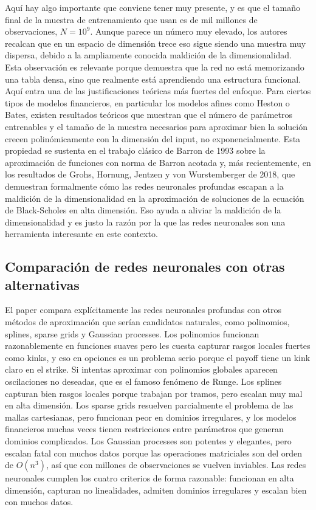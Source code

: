 \documentclass[11pt,a4paper]{article}
\begin{document}
Aquí hay algo importante que conviene tener muy presente, y es que el tamaño final de la muestra de entrenamiento que usan es de mil millones de observaciones, $N = 10^9$. Aunque parece un número muy elevado, los autores recalcan que en un espacio de dimensión trece eso sigue siendo una muestra muy dispersa, debido a la ampliamente conocida maldición de la dimensionalidad. Esta observación es relevante porque demuestra que la red no está memorizando una tabla densa, sino que realmente está aprendiendo una estructura funcional. Aquí entra una de las justificaciones teóricas más fuertes del enfoque. Para ciertos tipos de modelos financieros, en particular los modelos afines como Heston o Bates, existen resultados teóricos que muestran que el número de parámetros entrenables y el tamaño de la muestra necesarios para aproximar bien la solución crecen polinómicamente con la dimensión del input, no exponencialmente. Esta propiedad se sustenta en el trabajo clásico de Barron de 1993 sobre la aproximación de funciones con norma de Barron acotada y, más recientemente, en los resultados de Grohs, Hornung, Jentzen y von Wurstemberger de 2018, que demuestran formalmente cómo las redes neuronales profundas escapan a la maldición de la dimensionalidad en la aproximación de soluciones de la ecuación de Black-Scholes en alta dimensión. Eso ayuda a aliviar la maldición de la dimensionalidad y es justo la razón por la que las redes neuronales son una herramienta interesante en este contexto.

\subsection{Comparación de redes neuronales con otras alternativas}

El paper compara explícitamente las redes neuronales profundas con otros métodos de aproximación que serían candidatos naturales, como polinomios, splines, sparse grids y Gaussian processes. Los polinomios funcionan razonablemente en funciones suaves pero les cuesta capturar rasgos locales fuertes como kinks, y eso en opciones es un problema serio porque el payoff tiene un kink claro en el strike. Si intentas aproximar con polinomios globales aparecen oscilaciones no deseadas, que es el famoso fenómeno de Runge. Los splines capturan bien rasgos locales porque trabajan por tramos, pero escalan muy mal en alta dimensión. Los sparse grids resuelven parcialmente el problema de las mallas cartesianas, pero funcionan peor en dominios irregulares, y los modelos financieros muchas veces tienen restricciones entre parámetros que generan dominios complicados. Los Gaussian processes son potentes y elegantes, pero escalan fatal con muchos datos porque las operaciones matriciales son del orden de $O(n^3)$, así que con millones de observaciones se vuelven inviables. Las redes neuronales cumplen los cuatro criterios de forma razonable: funcionan en alta dimensión, capturan no linealidades, admiten dominios irregulares y escalan bien con muchos datos.
\end{document}
